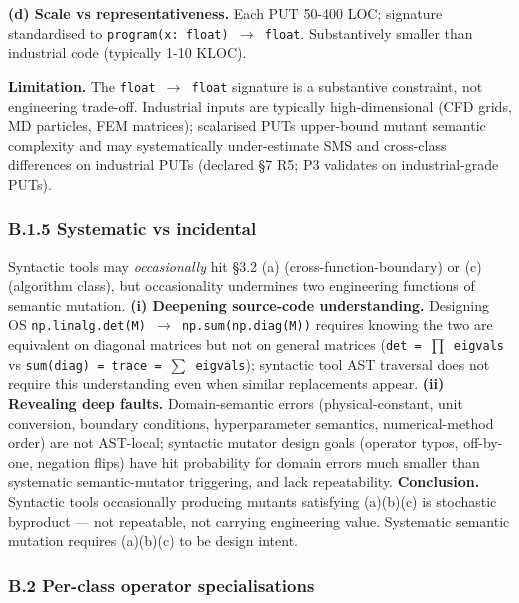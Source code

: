 \documentclass[review,12pt,authoryear]{elsarticle}
\begin{document}
\textbf{(d) Scale vs representativeness.} Each PUT 50-400 LOC; signature
standardised to \texttt{program(x:\ float)\ $\to$\ float}. Substantively
smaller than industrial code (typically 1-10 KLOC).

\textbf{Limitation.} The \texttt{float\ $\to$\ float} signature is a
substantive constraint, not engineering trade-off. Industrial inputs are
typically high-dimensional (CFD grids, MD particles, FEM matrices);
scalarised PUTs upper-bound mutant semantic complexity and may
systematically under-estimate SMS and cross-class differences on
industrial PUTs (declared §7 R5; P3 validates on industrial-grade PUTs).

\subsubsection{B.1.5 Systematic vs
incidental}\label{b.1.5-systematic-vs-incidental}

Syntactic tools may \emph{occasionally} hit §3.2 (a)
(cross-function-boundary) or (c) (algorithm class), but occasionality
undermines two engineering functions of semantic mutation. \textbf{(i)
Deepening source-code understanding.} Designing OS
\texttt{np.linalg.det(M)\ $\to$\ np.sum(np.diag(M))} requires knowing the
two are equivalent on diagonal matrices but not on general matrices
(\texttt{det\ =\ $\prod$\ eigvals} vs
\texttt{sum(diag)\ =\ trace\ =\ $\sum$\ eigvals}); syntactic tool AST
traversal does not require this understanding even when similar
replacements appear. \textbf{(ii) Revealing deep faults.}
Domain-semantic errors (physical-constant, unit conversion, boundary
conditions, hyperparameter semantics, numerical-method order) are not
AST-local; syntactic mutator design goals (operator typos, off-by-one,
negation flips) have hit probability for domain errors much smaller than
systematic semantic-mutator triggering, and lack repeatability.
\textbf{Conclusion.} Syntactic tools occasionally producing mutants
satisfying (a)(b)(c) is stochastic byproduct --- not repeatable, not
carrying engineering value. Systematic semantic mutation requires
(a)(b)(c) to be design intent.

\subsubsection{B.2 Per-class operator
specialisations}\label{b.2-per-class-operator-specialisations}
\end{document}
